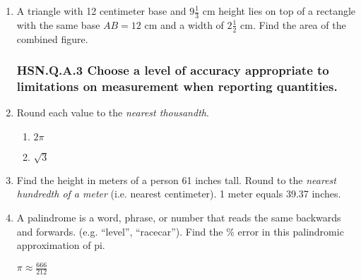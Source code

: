 \begin{enumerate}
\newpage
\item A triangle with 12 centimeter base and $9 \frac{1}{3}$ cm height lies on top of a rectangle with the same base $AB=12$ cm and a width of $2 \frac{1}{2}$ cm. Find the area of the combined figure. \par \medskip
   \vspace{1.0cm}

\subsubsection*{{\tiny HSN.Q.A.3} Choose a level of accuracy appropriate to limitations on measurement when reporting quantities.}
\item Round each value to the \emph{nearest thousandth}.
  \begin{multicols}{2}
    \begin{enumerate}
      \item $2 \pi$
      \item $\sqrt{3}$
    \end{enumerate}
  \end{multicols} \bigskip 

\item Find the height in meters of a person 61 inches tall. Round to the \emph{nearest hundredth of a meter} (i.e. nearest centimeter). 1 meter equals 39.37 inches.
\vspace{3cm}

\item A palindrome is a word, phrase, or number that reads the same backwards and forwards. (e.g. ``level'', ``racecar''). Find the \% error in this palindromic approximation of pi. \par \bigskip
  $\displaystyle \pi \approx \frac{666}{212}$ \vspace{1.5cm}
  
\newpage

\end{enumerate}
